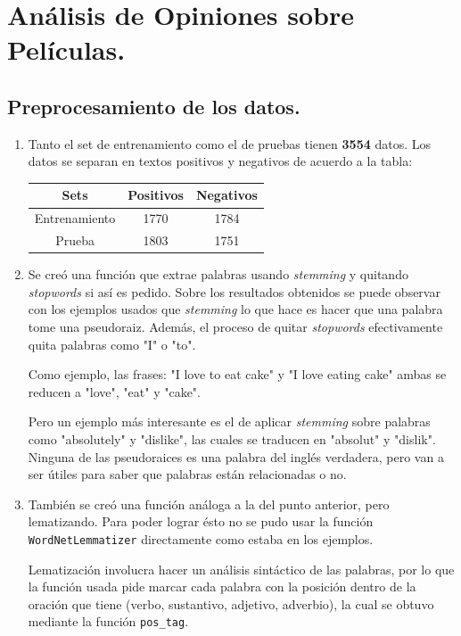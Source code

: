 \documentclass[11pt,letterpaper]{article}
\begin{document}
\section{Análisis de Opiniones sobre Películas.}
\label{sec:orgheadline4}
\subsection{Preprocesamiento de los datos.}
\label{sec:orgheadline2}
\begin{enumerate}
\item Tanto el set de entrenamiento como el de pruebas tienen \textbf{3554} datos.
Los datos se separan en textos positivos y negativos de acuerdo a la tabla:
\begin{center}
\begin{tabular}{|c|c|c|}
\hline
Sets & Positivos & Negativos\\
\hline
Entrenamiento & 1770 & 1784\\
Prueba & 1803 & 1751\\
\hline
\end{tabular}
\end{center}
\item Se creó una función que extrae palabras usando \emph{stemming} y quitando
\emph{stopwords} si así es pedido. Sobre los resultados obtenidos se puede
observar con los ejemplos usados que \emph{stemming} lo que hace es hacer que
una palabra tome una pseudoraiz. Además, el proceso de quitar \emph{stopwords}
efectivamente quita palabras como "I" o "to".

Como ejemplo, las frases: "I love to eat cake" y "I love eating cake" ambas
se reducen a "love", "eat" y "cake".

Pero un ejemplo más interesante es el de aplicar \emph{stemming} sobre palabras
como "absolutely" y "dislike", las cuales se traducen en "absolut" y
"dislik". Ninguna de las pseudoraices es una palabra del inglés verdadera,
pero van a ser útiles para saber que palabras están relacionadas o no.
\item También se creó una función análoga a la del punto anterior, pero
lematizando. Para poder lograr ésto no se pudo usar la función
\texttt{WordNetLemmatizer} directamente como estaba en los ejemplos.

Lematización involucra hacer un análisis sintáctico de las palabras, por lo
que la función usada pide marcar cada palabra con la posición dentro de la
oración que tiene (verbo, sustantivo, adjetivo, adverbio), la cual se
obtuvo mediante la función \texttt{pos\_tag}.


\end{enumerate}
\end{document}
